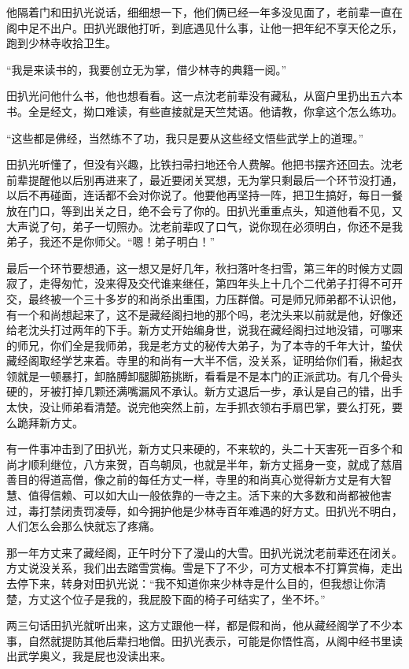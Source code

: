 他隔着门和田扒光说话，细细想一下，他们俩已经一年多没见面了，老前辈一直在阁中足不出户。田扒光跟他打听，到底遇见什么事，让他一把年纪不享天伦之乐，跑到少林寺收拾卫生。

“我是来读书的，我要创立无为掌，借少林寺的典籍一阅。”

田扒光问他什么书，他也想看看。这一点沈老前辈没有藏私，从窗户里扔出五六本书。全是经文，拗口难读，有些直接就是天竺梵语。他请教，你拿这个怎么练功。

“这些都是佛经，当然练不了功，我只是要从这些经文悟些武学上的道理。”

田扒光听懂了，但没有兴趣，比铁扫帚扫地还令人费解。他把书摆齐还回去。沈老前辈提醒他以后别再进来了，最近要闭关冥想，无为掌只剩最后一个环节没打通，以后不再碰面，连话都不会对你说了。他要他再坚持一阵，把卫生搞好，每日一餐放在门口，等到出关之日，绝不会亏了你的。田扒光重重点头，知道他看不见，又大声说了句，弟子一切照办。沈老前辈叹了口气，说你现在必须明白，你还不是我弟子，我还不是你师父。“嗯！弟子明白！”

最后一个环节要想通，这一想又是好几年，秋扫落叶冬扫雪，第三年的时候方丈圆寂了，走得匆忙，没来得及交代谁来继任，第四年头上十几个二代弟子打得不可开交，最终被一个三十多岁的和尚杀出重围，力压群僧。可是师兄师弟都不认识他，有一个和尚想起来了，这不是藏经阁扫地的那个吗，老沈头来以前就是他，好像还给老沈头打过两年的下手。新方丈开始编身世，说我在藏经阁扫过地没错，可哪来的师兄，你们全是我师弟，我是老方丈的秘传大弟子，为了本寺的千年大计，蛰伏藏经阁取经学艺来着。寺里的和尚有一大半不信，没关系，证明给你们看，揪起衣领就是一顿暴打，卸胳膊卸腿脚筋挑断，看看是不是本门的正派武功。有几个骨头硬的，牙被打掉几颗还满嘴漏风不承认。新方丈退后一步，承认是自己的错，出手太快，没让师弟看清楚。说完他突然上前，左手抓衣领右手扇巴掌，要么打死，要么跪拜新方丈。

有一件事冲击到了田扒光，新方丈只来硬的，不来软的，头二十天害死一百多个和尚才顺利继位，八方来贺，百鸟朝凤，也就是半年，新方丈摇身一变，就成了慈眉善目的得道高僧，像之前的每任方丈一样，寺里的和尚真心觉得新方丈是有大智慧、值得信赖、可以如大山一般依靠的一寺之主。活下来的大多数和尚都被他害过，毒打禁闭责罚凌辱，如今拥护他是少林寺百年难遇的好方丈。田扒光不明白，人们怎么会那么快就忘了疼痛。

那一年方丈来了藏经阁，正午时分下了漫山的大雪。田扒光说沈老前辈还在闭关。方丈说没关系，我们出去踏雪赏梅。雪是下了不少，可方丈根本不打算赏梅，走出去停下来，转身对田扒光说：“我不知道你来少林寺是什么目的，但我想让你清楚，方丈这个位子是我的，我屁股下面的椅子可结实了，坐不坏。”

两三句话田扒光就听出来，这方丈跟他一样，都是假和尚，他从藏经阁学了不少本事，自然就提防其他后辈扫地僧。田扒光表示，可能是你悟性高，从阁中经书里读出武学奥义，我是屁也没读出来。


